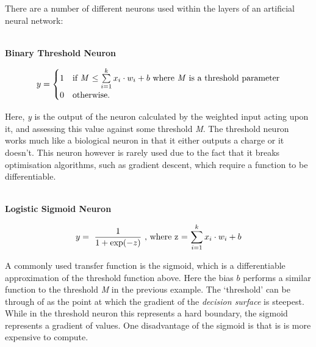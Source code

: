 \documentclass[a4paper,11pt,titlepage]{article}
\begin{document}
There are a number of different neurons used within the layers of an artificial neural network:
		\\\
		
		\textbf{Binary Threshold Neuron} 
		
		$$
		y = \begin{cases}
		1 & \text{if \textit{M} $\le \sum\limits_{i=1}^k x_{i} \cdot w_{i} + b $ where \textit{M} is a threshold parameter} \\
		0 & \text{otherwise.}
		\end{cases}
		$$

		Here, \textit{y} is the output of the neuron calculated by the weighted input acting upon it, and assessing this value against some threshold \textit{M}. The threshold neuron works much like a biological neuron in that it either outputs a charge or it doesn't. This neuron however is rarely used due to the fact that it breaks optimisation algorithms, such as gradient descent, which require a function to be differentiable. 
	\\\

		\textbf{Logistic Sigmoid Neuron}	
		
		$$
		y = 
		\text{ $ \frac{1}{1 + \exp (-z)} $
		, where z = $ \sum\limits_{i=1}^k x_{i} \cdot w_{i} + b $}
		$$ 
		
		A commonly used transfer function is the sigmoid, which is a differentiable approximation of the threshold function above. Here the bias $ b $ performs a similar function to the threshold \textit{M} in the previous example. The `threshold' can be through of as the point at which the gradient of the \textit{decision surface} is steepest. While in the threshold neuron this represents a hard boundary, the sigmoid represents a gradient of values. One disadvantage of the sigmoid is that is is more expensive to compute.
		
		\begin{figure}[H]
    			\centering	
    			\qquad
    			\qquad
    			\caption{}%
    			\label{fig:SigmoidNeurons}
		\end{figure}
\end{document}
